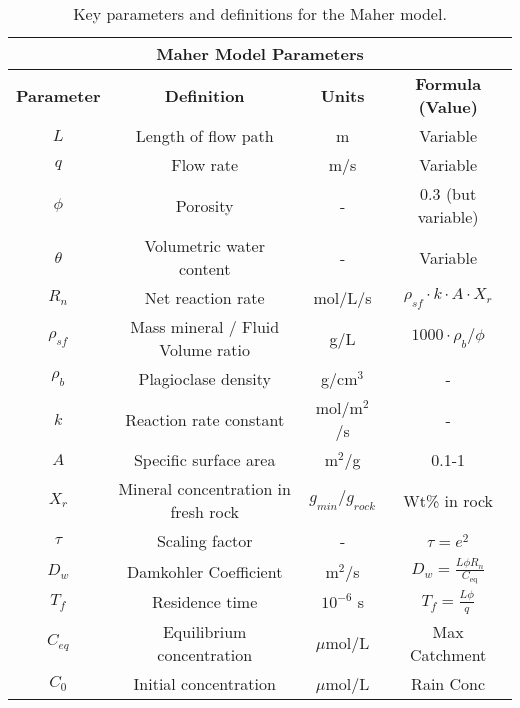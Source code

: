 \begin{tcolorbox}
{\begin{table}[H]
    \centering
    \begin{tabular}{|c|c|c|c|}
        \hline  %
        \multicolumn{4}{|c|}{\textbf{Maher Model Parameters}} \\  
        \hline
        \textbf{Parameter} & \textbf{Definition} & \textbf{Units} & \textbf{Formula (Value)} \\  
        $L$ & Length of flow path & m & Variable \\
        $q$ & Flow rate & m/s & Variable \\
        $\phi$ & Porosity & - & 0.3 (but variable) \\
        $\theta$ & Volumetric water content & - & Variable \\
        $R_n$ & Net reaction rate & mol/L/s & $\rho_{sf} \cdot k \cdot A \cdot X_r $ \\
        $\rho_{sf}$ & Mass mineral / Fluid Volume ratio & g/L & $1000 \cdot \rho_b / \phi$ \\
        $\rho_b$ & Plagioclase density & g/cm$^3$ & - \\
        $k$ & Reaction rate constant & mol/m$^2$/s & - \\
        $A$ & Specific surface area & m$^2$/g & 0.1-1 \\
        $X_r$ & Mineral concentration in fresh rock & $g_{min}/g_{rock}$& Wt\% in rock \\
        $\tau$ & Scaling factor & - & $\tau = e^2$ \\
        $D_w$ & Damkohler Coefficient & m$^2$/s & $D_w = \frac{L \phi R_n}{C_{\text{eq}}}$ \\
        $T_f$ & Residence time & $10^{-6}$ s & $T_f = \frac{L \phi}{q}$ \\
        $C_{eq}$ & Equilibrium concentration & $\mu$mol/L & Max Catchment \\
        $C_0$ & Initial concentration & $\mu$mol/L & Rain Conc \\
        \hline
    \end{tabular}
    \caption{Key parameters and definitions for the Maher model.}
    \label{tab:parameters2}
\end{table}

\FloatBarrier

}

\end{tcolorbox}

